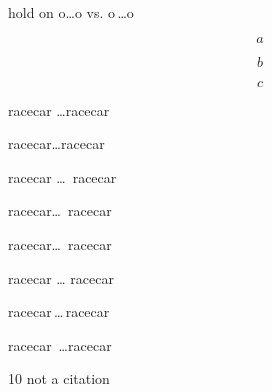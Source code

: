 \documentclass{amsart}
\begin{document}
hold on o\dots o vs. o\,\dots o

\begin{equation}\label{a}
a
\end{equation}

\begin{equation}\label{b}
b
\end{equation}


\begin{equation}\label{c}
c
\end{equation}

racecar \dots racecar

racecar\dots racecar

racecar \dots\ racecar

racecar\dots\ racecar

racecar\dots\, racecar

racecar \dots\! racecar

racecar\,\dots\,racecar

racecar\, \dots racecar

\begin{thebibliography}{10}
 not a citation
\end{thebibliography}
\end{document}
